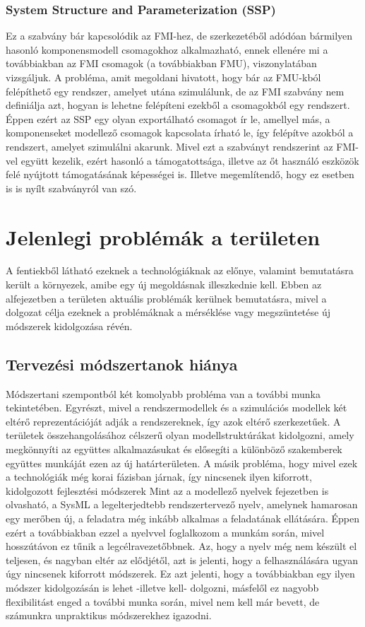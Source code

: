         \subsubsection{System Structure and Parameterization (SSP)}
        Ez a szabvány bár kapcsolódik az FMI-hez, de szerkezetéből adódóan bármilyen hasonló
        komponensmodell csomagokhoz alkalmazható, ennek ellenére mi a továbbiakban az FMI csomagok (a
        továbbiakban FMU), viszonylatában vizsgáljuk. A probléma, amit megoldani hivatott, hogy bár az
        FMU-kból felépíthető egy rendszer, amelyet utána szimulálunk, de az FMI szabvány nem definiálja
        azt, hogyan is lehetne felépíteni ezekből a csomagokból egy rendszert. Éppen ezért az SSP egy olyan
        exportálható csomagot ír le, amellyel más, a komponenseket modellező csomagok kapcsolata írható le,
        így felépítve azokból a rendszert, amelyet szimulálni akarunk. Mivel ezt a szabványt rendszerint az
        FMI-vel együtt kezelik, ezért hasonló a támogatottsága, illetve az őt használó eszközök felé nyújtott
        támogatásának képességei is. Illetve megemlítendő, hogy ez esetben is is nyílt szabványról van szó.


\section{Jelenlegi problémák a területen}
A fentiekből látható ezeknek a technológiáknak az előnye, valamint bemutatásra került a környezek, amibe egy új megoldásnak illeszkednie kell.
Ebben az alfejezetben a területen aktuális problémák kerülnek bemutatásra, mivel a dolgozat célja ezeknek a problémáknak a mérséklése vagy megszüntetése új módszerek kidolgozása révén.

    \subsection{Tervezési módszertanok hiánya}
    Módszertani szempontból két komolyabb probléma van a további munka tekintetében.
    Egyrészt, mivel a rendszermodellek és a szimulációs modellek két eltérő reprezentációját adják a rendszereknek, így azok eltérő szerkezetűek.
    A területek összehangolásához célszerű olyan modellstruktúrákat kidolgozni, amely megkönnyíti az együttes alkalmazásukat és elősegíti a különböző szakemberek együttes munkáját ezen az új határterületen.
    A másik probléma, hogy mivel ezek a technológiák még korai fázisban járnak, így nincsenek ilyen kiforrott, kidolgozott fejlesztési módszerek
    Mint az a modellező nyelvek fejezetben is olvasható, a SysML a legelterjedtebb rendszertervező nyelv, amelynek hamarosan egy merőben új, a feladatra még inkább alkalmas a feladatának ellátására.
    Éppen ezért a továbbiakban ezzel a nyelvvel foglalkozom a munkám során, mivel hosszútávon ez tűnik a legcélravezetőbbnek.
    Az, hogy a nyelv még nem készült el teljesen, és nagyban eltér az elődjétől, azt is jelenti, hogy a felhasználására ugyan úgy nincsenek kiforrott módszerek.
    Ez azt jelenti, hogy a továbbiakban egy ilyen módszer kidolgozásán is lehet -illetve kell- dolgozni, másfelől ez nagyobb flexibilitást enged a további munka során, mivel nem kell már bevett, de számunkra unpraktikus módszerekhez igazodni.

